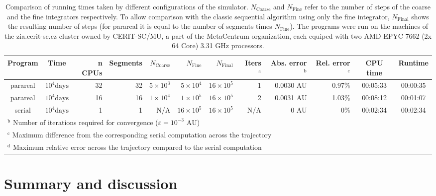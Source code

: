 \documentclass[conference]{IEEEtran}
\begin{document}
\begin{table*}[htbp]
\caption{Comparison of running times taken by different configurations of the simulator. 
$N_{\text{Coarse}}$ and $N_{\text{Fine}}$ refer to the number of steps of the coarse and the fine integrators respectively. 
To allow comparison with the classic sequential algorithm using only the fine integrator, $N_{\text{Final}}$ shows the resulting number of steps (for parareal it is equal to the number of segments times $N_\text{Fine}$).
\newline The programs were run on the machines of the zia.cerit-sc.cz cluster owned by CERIT-SC/MU, a part of the MetaCentrum organization, each equiped with two AMD EPYC 7662 (2x 64 Core) 3.31 GHz processors.}
\begin{center}
\begin{tabular}{ccrrrrrrrrcc}
\toprule
Program & Time &  n CPUs & Segments & $N_\text{Coarse}$ & $N_{\text{Fine}}$ & $N_{\text{Final}}$ & Iters $^{\mathrm{a}}$ & Abs. error $^{\mathrm{b}}$ & Rel. error $^{\mathrm{c}}$ & CPU time & Runtime \\
\midrule
parareal & $10^4\text{days}$ & 32 & 32 &  $5\times10^3$ &  $5\times10^4$ & $16\times10^5$ & 1 & 0.0030 AU & 0.97\% & 00:05:33 & 00:00:35 \\
parareal & $10^4\text{days}$ & 16 & 16 & $1\times10^4$ & $1\times10^5$ & $16\times10^5$ & 2 & 0.0031 AU & 1.03\% & 00:08:12 & 00:01:07 \\
serial & $10^4\text{days}$ & 1 & 1 & N/A & $16\times10^5$ & $16\times10^5$ & N/A & 0 AU & 0\% & 00:02:34 & 00:02:34 \\
\bottomrule
\multicolumn{11}{l}{$^{\mathrm{b}}$ Number of iterations required for convergence ($\varepsilon = 10^{-3}\text{ AU}$)} \\
\multicolumn{11}{l}{$^{\mathrm{c}}$ Maximum difference from the corresponding serial computation across the trajectory} \\
\multicolumn{11}{l}{$^{\mathrm{d}}$ Maximum relative error across the trajectory compared to the serial computation} \\
\end{tabular}
\label{runtimes}
\end{center}
\end{table*}

\section{Summary and discussion}
\end{document}
